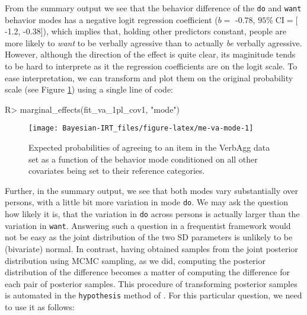 \documentclass[jss]{jss}
\begin{document}
From the summary output we see that the behavior difference of the
\texttt{do} and \texttt{want} behavior modes has a negative logit
regression coefficient (\(b =\) -0.78, \(95\% \; \text{CI} = [\)-1.2,
-0.38\(]\)), which implies that, holding other predictors constant,
people are more likely to \emph{want} to be verbally agressive than to
actually \emph{be} verbally agressive. However, although the direction
of the effect is quite clear, its maginitude tends to be hard to
interprete as it the regression coefficients are on the logit scale. To
ease interpretation, we can transform and plot them on the original
probability scale (see Figure \ref{fig:me-va-mode}) using a single line
of code:

\begin{CodeChunk}

\begin{CodeInput}
R> marginal_effects(fit_va_1pl_cov1, "mode")
\end{CodeInput}
\begin{figure}

{\centering \texttt{[image: Bayesian-IRT\_files/figure-latex/me-va-mode-1]} 

}

\caption[Expected probabilities of agreeing to an item in the VerbAgg data set as a function of the behavior mode conditioned on all other covariates being set to their reference categories]{Expected probabilities of agreeing to an item in the VerbAgg data set as a function of the behavior mode conditioned on all other covariates being set to their reference categories.}\label{fig:me-va-mode}
\end{figure}
\end{CodeChunk}

Further, in the summary output, we see that both modes vary
substantially over persons, with a little bit more variation in mode
\texttt{do}. We may ask the question how likely it is, that the
variation in \texttt{do} across persons is actually larger than the
variation in \texttt{want}. Answering such a question in a frequentist
framework would not be easy as the joint distribution of the two SD
parameters is unlikely to be (bivariate) normal. In contrast, having
obtained samples from the joint posterior distribution using MCMC
sampling, as we did, computing the posterior distribution of the
difference becomes a matter of computing the difference for each pair of
posterior samples. This procedure of transforming posterior samples is
automated in the \texttt{hypothesis} method of . For this
particular question, we need to use it as follows:
\end{document}
